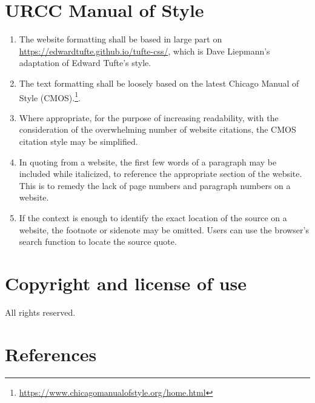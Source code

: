 \documentclass[12pt]{article}
\begin{document}


\section{URCC Manual of Style}

\begin{enumerate}
	\item The website formatting shall be based in large part on \href{https://edwardtufte.github.io/tufte-css/}{https://edwardtufte.github.io/tufte-css/}, which is Dave Liepmann's adaptation of Edward Tufte's style.
	\item The text formatting shall be loosely based on the latest Chicago Manual of Style (CMOS).\footnote{\href{https://www.chicagomanualofstyle.org/home.html}{https://www.chicagomanualofstyle.org/home.html}}.
	\item Where appropriate, for the purpose of increasing readability, with the consideration of the overwhelming number of website citations, the CMOS citation style may be simplified.
	\item In quoting from a website, the first few words of a paragraph may be included while italicized, to reference the appropriate section of the website. This is to remedy the lack of page numbers and paragraph numbers on a website.
	\item If the context is enough to identify the exact location of the source on a website, the footnote or sidenote may be omitted. Users can use the browser's search function to locate the source quote.
\end{enumerate}

\section{Copyright and license of use}

All rights reserved.


\section{References}

\printbibliography[heading=none]
\end{document}
